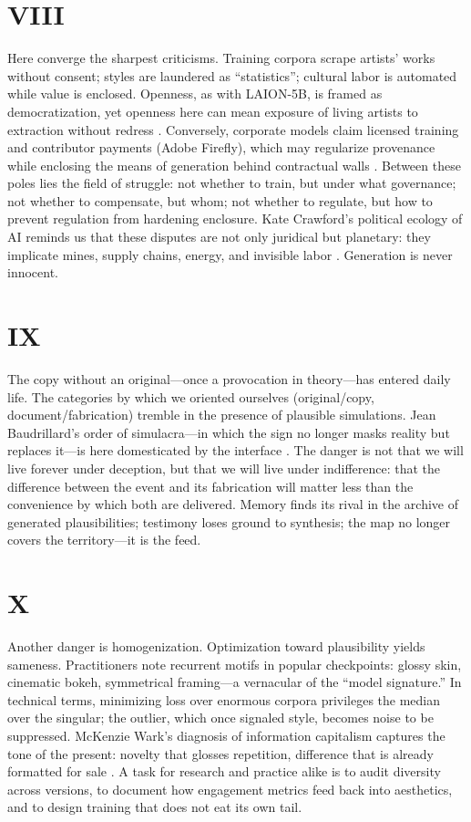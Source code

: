 \documentclass[12pt]{article}
\begin{document}
\section*{VIII}

Here converge the sharpest criticisms. Training corpora scrape artists' works without consent; styles are laundered as ``statistics''; cultural labor is automated while value is enclosed. Openness, as with LAION-5B, is framed as democratization, yet openness here can mean exposure of living artists to extraction without redress \autocite{Schuhmann2022}. Conversely, corporate models claim licensed training and contributor payments (Adobe Firefly), which may regularize provenance while enclosing the means of generation behind contractual walls \autocite{Adobe2023}. Between these poles lies the field of struggle: not whether to train, but under what governance; not whether to compensate, but whom; not whether to regulate, but how to prevent regulation from hardening enclosure. Kate Crawford's political ecology of AI reminds us that these disputes are not only juridical but planetary: they implicate mines, supply chains, energy, and invisible labor \autocite{Crawford2021}. Generation is never innocent.

\section*{IX}

The copy without an original---once a provocation in theory---has entered daily life. The categories by which we oriented ourselves (original/copy, document/fabrication) tremble in the presence of plausible simulations. Jean Baudrillard's order of simulacra---in which the sign no longer masks reality but replaces it---is here domesticated by the interface \autocite{Baudrillard1994}. The danger is not that we will live forever under deception, but that we will live under indifference: that the difference between the event and its fabrication will matter less than the convenience by which both are delivered. Memory finds its rival in the archive of generated plausibilities; testimony loses ground to synthesis; the map no longer covers the territory---it is the feed.

\section*{X}

Another danger is homogenization. Optimization toward plausibility yields sameness. Practitioners note recurrent motifs in popular checkpoints: glossy skin, cinematic bokeh, symmetrical framing---a vernacular of the ``model signature.'' In technical terms, minimizing loss over enormous corpora privileges the median over the singular; the outlier, which once signaled style, becomes noise to be suppressed. McKenzie Wark's diagnosis of information capitalism captures the tone of the present: novelty that glosses repetition, difference that is already formatted for sale \autocite{Wark2019}. A task for research and practice alike is to audit diversity across versions, to document how engagement metrics feed back into aesthetics, and to design training that does not eat its own tail.
\end{document}
